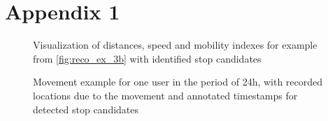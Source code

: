 \chapter{Appendix 1}
\label{appendix:add_example_1}

\begin{figure}[!ht]
	\centering
	\caption{ Visualization of distances, speed and mobility indexes for example from \autoref{fig:reco_ex_3b} with identified stop candidates }
	\label{fig:reco_ex_3a}
\end{figure} 
\begin{figure}[!ht]
	\centering
	\caption{ Movement example for one user in the period of 24h, with recorded locations due to the movement and annotated timestamps for detected stop candidates }
	\label{fig:reco_ex_3b}
\end{figure}